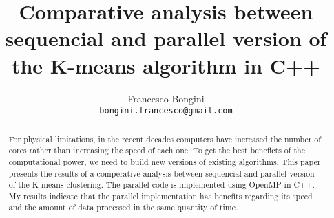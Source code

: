 \documentclass[10pt,twocolumn,letterpaper]{article}
\begin{document}
\title{Comparative analysis between sequencial and parallel version of the K-means algorithm in C++ }

\author{Francesco Bongini\\
\tt\small bongini.francesco@gmail.com}

\maketitle
\thispagestyle{empty}

\begin{abstract}
For physical limitations, in the recent decades computers have increased the number of cores rather than increasing the speed of each one.
To get the best beneficts of the computational power, we need to build new versions of existing algorithms.
This paper presents the results of a comperative analysis between sequencial
and parallel version of the K-means clustering. The parallel code is implemented using OpenMP in C++.
My results indicate that the parallel implementation has benefits regarding its speed and the amount of data processed in the same quantity of time. 
\end{abstract}
\end{document}
